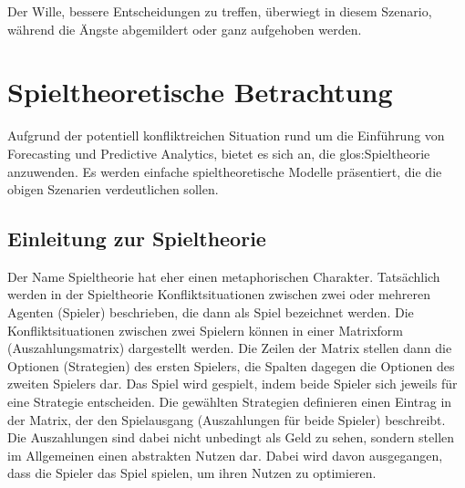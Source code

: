 
Der Wille, bessere Entscheidungen zu treffen, überwiegt in diesem Szenario, während
die Ängste abgemildert oder ganz aufgehoben werden.

\section{Spieltheoretische Betrachtung}


Aufgrund der potentiell konfliktreichen Situation rund um die Einführung von
Forecasting und Predictive Analytics, bietet es sich an, die
\gls{glos:Spieltheorie} anzuwenden. Es werden einfache spieltheoretische Modelle
präsentiert, die die obigen Szenarien verdeutlichen sollen.

\subsection{Einleitung zur Spieltheorie}

Der Name Spieltheorie hat eher einen metaphorischen Charakter. Tatsächlich
werden in der Spieltheorie Konfliktsituationen zwischen zwei oder mehreren Agenten (Spieler) beschrieben,
die dann als Spiel bezeichnet werden. Die Konfliktsituationen zwischen zwei Spielern können in einer Matrixform (Auszahlungsmatrix)
dargestellt werden. Die Zeilen der Matrix stellen dann die Optionen (Strategien) des ersten Spielers, die Spalten dagegen die
Optionen des zweiten Spielers dar. Das Spiel wird gespielt, indem beide Spieler sich jeweils für eine Strategie entscheiden. 
Die gewählten Strategien definieren einen Eintrag in der Matrix, der den Spielausgang (Auszahlungen für beide Spieler) beschreibt.
Die Auszahlungen sind dabei nicht unbedingt als Geld zu sehen, sondern stellen im Allgemeinen einen abstrakten Nutzen dar. Dabei
wird davon ausgegangen, dass die Spieler das Spiel spielen, um ihren Nutzen zu optimieren.

